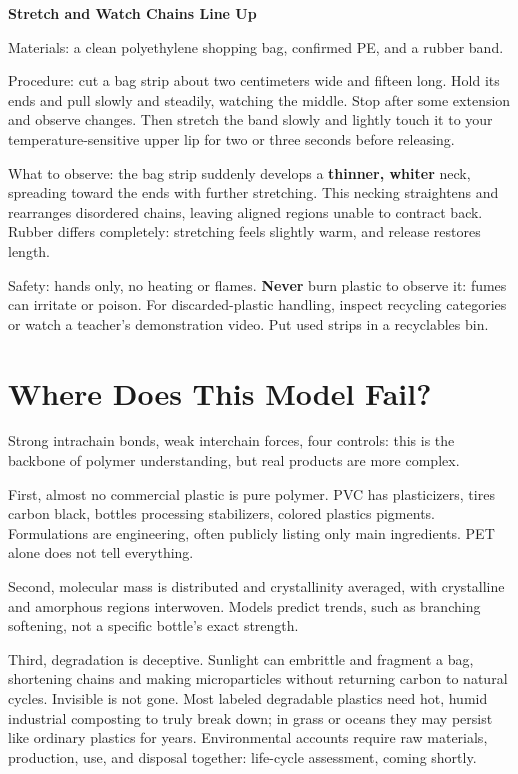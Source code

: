 \begin{shiyan}
\textbf{Stretch and Watch Chains Line Up}

Materials: a clean polyethylene shopping bag, confirmed PE, and a rubber band.

Procedure: cut a bag strip about two centimeters wide and fifteen long. Hold its ends and pull slowly and steadily, watching the middle. Stop after some extension and observe changes. Then stretch the band slowly and lightly touch it to your temperature-sensitive upper lip for two or three seconds before releasing.

What to observe: the bag strip suddenly develops a \textbf{thinner, whiter} neck, spreading toward the ends with further stretching. This necking straightens and rearranges disordered chains, leaving aligned regions unable to contract back. Rubber differs completely: stretching feels slightly warm, and release restores length.

Safety: hands only, no heating or flames. \textbf{Never} burn plastic to observe it: fumes can irritate or poison. For discarded-plastic handling, inspect recycling categories or watch a teacher's demonstration video. Put used strips in a recyclables bin.
\end{shiyan}

\section{Where Does This Model Fail?}

Strong intrachain bonds, weak interchain forces, four controls: this is the backbone of polymer understanding, but real products are more complex.

First, almost no commercial plastic is pure polymer. PVC has plasticizers, tires carbon black, bottles processing stabilizers, colored plastics pigments. Formulations are engineering, often publicly listing only main ingredients. PET alone does not tell everything.

Second, molecular mass is distributed and crystallinity averaged, with crystalline and amorphous regions interwoven. Models predict trends, such as branching softening, not a specific bottle's exact strength.

Third, degradation is deceptive. Sunlight can embrittle and fragment a bag, shortening chains and making microparticles without returning carbon to natural cycles. Invisible is not gone. Most labeled degradable plastics need hot, humid industrial composting to truly break down; in grass or oceans they may persist like ordinary plastics for years. Environmental accounts require raw materials, production, use, and disposal together: life-cycle assessment, coming shortly.

